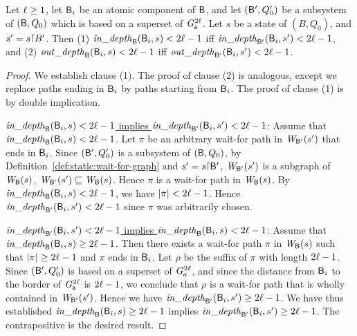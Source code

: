 \begin{proposition} \label{prop:in-out-projection}
Let $\ell \ge 1$, let $\mathsf{B}_i$ be an atomic component of $\mathsf{B}$, and let 
$(\mathsf{B}', Q'_0)$ be a subsystem of $(\mathsf{B}, Q_0)$ which is based on a superset of $\mathit{G}_{\mathsf{a}}^{2\ell}$.
Let $s$ be a state of $(B, Q_0)$, and $s' = s \pj B'$. Then
(1) $\mathit{in\_depth}_{\mathsf{B}}({\mathsf{B}_i, s}) < 2\ell-1$ iff $\mathit{in\_depth}_{\mathsf{B}'}({\mathsf{B}_i, s'}) < 2\ell-1$, and
(2) $\mathit{out\_depth}_{\mathsf{B}}({\mathsf{B}_i, s}) < 2\ell-1$ iff $\mathit{out\_depth}_{\mathsf{B}'}({\mathsf{B}_i, s'}) < 2\ell-1$.
\end{proposition}
%
\begin{proof}
We establish clause (1). The proof of clause (2) is analogous, except we replace paths ending in
$\mathsf{B}_i$ by paths starting from $\mathsf{B}_i$.
The proof of clause (1) is by double implication.

\vspace{1.0ex}
\ul{$\mathit{in\_depth}_{\mathsf{B}}({\mathsf{B}_i, s}) < 2\ell-1$ implies $\mathit{in\_depth}_{\mathsf{B}'}({\mathsf{B}_i, s'}) < 2\ell-1$}:
%
Assume that $\mathit{in\_depth}_{\mathsf{B}}({\mathsf{B}_i, s}) < 2\ell-1$.
Let $\pi$ be an arbitrary wait-for path in $\mathit{W}_{\mathsf{B}'}({s'})$ that ends in $\mathsf{B}_i$. 
%
Since $(\mathsf{B}', Q'_0)$ is a subsystem of $(\mathsf{B}, Q_0)$, by Definition~\ref{def:static:wait-for-graph} and $s' = s \pj \B'$,
$\mathit{W}_{\mathsf{B}'}({s'})$ is a subgraph of $\mathit{W}_{\mathsf{B}}({s})$, \ie $\mathit{W}_{\mathsf{B}'}({s'}) \sqsubseteq \mathit{W}_{\mathsf{B}}({s})$.
%
Hence $\pi$ is a wait-for path in $\mathit{W}_{\mathsf{B}}({s})$.
By $\mathit{in\_depth}_{\mathsf{B}}({\mathsf{B}_i, s}) < 2\ell-1$, we have $|\pi| < 2\ell-1$. 
Hence $\mathit{in\_depth}_{\mathsf{B}'}({\mathsf{B}_i, s'}) < 2\ell-1$ since $\pi$ was arbitrarily chosen.



\vspace{1.0ex}
\ul{$\mathit{in\_depth}_{\mathsf{B}'}({\mathsf{B}_i, s'}) < 2\ell-1$ implies $\mathit{in\_depth}_{\mathsf{B}}({\mathsf{B}_i, s}) < 2\ell-1$}:
%
Assume that $\mathit{in\_depth}_{\mathsf{B}}({\mathsf{B}_i, s}) \ge 2\ell-1$. Then there exists a wait-for path $\pi$ in $\mathit{W}_{\mathsf{B}}({s})$ such that 
$|\pi| \ge 2\ell-1$ and $\pi$ ends in $\mathsf{B}_i$. Let $\rho$ be the suffix of $\pi$ with length $2\ell-1$. 
%
Since $(\mathsf{B}', Q'_0)$ is based on a superset of $\mathit{G}_{a}^{2\ell}$, and since the distance from $\mathsf{B}_i$ to the border of 
$\mathit{G}_{\mathsf{a}}^{2\ell}$ is $2\ell-1$, we conclude that $\rho$ is a wait-for path
that is wholly contained in $\mathit{W}_{\mathsf{B}'}({s'})$. Hence we have $\mathit{in\_depth}_{\mathsf{B}'}({\mathsf{B}_i, s'}) \ge 2\ell-1$.
%
We have thus established 
$\mathit{in\_depth}_{\mathsf{B}}({\mathsf{B}_i, s}) \ge 2\ell-1$ implies $\mathit{in\_depth}_{\mathsf{B}'}({\mathsf{B}_i, s'}) \ge 2\ell-1$.
The contrapositive is the desired result.
\end{proof}





